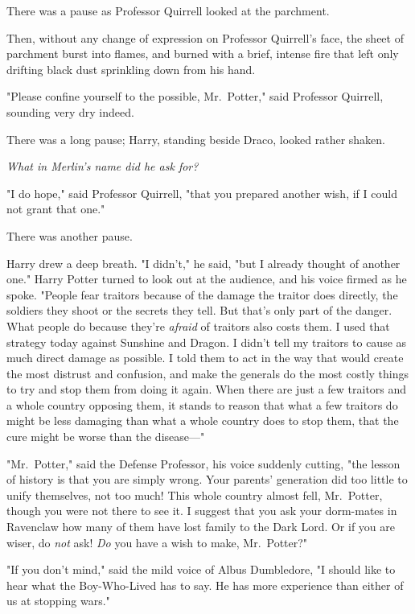 There was a pause as Professor Quirrell looked at the parchment.

Then, without any change of expression on Professor Quirrell's face, the sheet 
of parchment burst into flames, and burned with a brief, intense fire that left 
only drifting black dust sprinkling down from his hand.

"Please confine yourself to the possible, Mr.~Potter," said Professor Quirrell, 
sounding very dry indeed.

There was a long pause; Harry, standing beside Draco, looked rather shaken.

\emph{What in Merlin's name did he ask for?}

"I do hope," said Professor Quirrell, "that you prepared another wish, if I 
could not grant that one."

There was another pause.

Harry drew a deep breath. "I didn't," he said, "but I already thought of 
another one." Harry Potter turned to look out at the audience, and his voice 
firmed as he spoke. "People fear traitors because of the damage the traitor 
does directly, the soldiers they shoot or the secrets they tell. But that's 
only part of the danger. What people do because they're \emph{afraid} of 
traitors also costs them. I used that strategy today against Sunshine and 
Dragon. I didn't tell my traitors to cause as much direct damage as possible. I 
told them to act in the way that would create the most distrust and confusion, 
and make the generals do the most costly things to try and stop them from doing 
it again. When there are just a few traitors and a whole country opposing them, 
it stands to reason that what a few traitors do might be less damaging than 
what a whole country does to stop them, that the cure might be worse than the 
disease---"

"Mr.~Potter," said the Defense Professor, his voice suddenly cutting, "the 
lesson of history is that you are simply wrong. Your parents' generation did 
too little to unify themselves, not too much! This whole country almost fell, 
Mr.~Potter, though you were not there to see it. I suggest that you ask your 
dorm-mates in Ravenclaw how many of them have lost family to the Dark Lord. Or 
if you are wiser, do \emph{not} ask! \emph{Do} you have a wish to make, 
Mr.~Potter?"

"If you don't mind," said the mild voice of Albus Dumbledore, "I should like to 
hear what the Boy-Who-Lived has to say. He has more experience than either of 
us at stopping wars."

